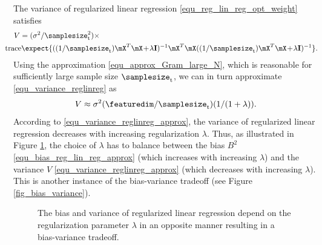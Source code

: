 \documentclass[12pt]{report}
\begin{document}
The variance of regularized linear regression \eqref{equ_reg_lin_reg_opt_weight} satisfies 
\begin{align}
\label{equ_variance_reglinreg}
V & =( \sigma^{2}/\samplesize^{2}_{\rm t}) \times \nonumber \\ 
& \hspace*{-7mm} {\rm trace} \expect \{  ( (1/\samplesize_{\rm t}) \mX^{T} \mX\!+\!\lambda \mathbf{I} )^{-1} \mX^{T} \mX ( (1/\samplesize_{\rm t}) \mX^{T} \mX\!+\!\lambda \mathbf{I} )^{-1}   \}.
\end{align}
Using the approximation \eqref{equ_approx_Gram_large_N}, which is reasonable for sufficiently 
large sample size $\samplesize_{\rm t}$, we can in turn approximate \eqref{equ_variance_reglinreg} as 
\begin{equation}
\label{equ_variance_reglinreg_approx}
V \approx \sigma^{2} (\featuredim/\samplesize_{\rm t}) (1/(1+ \lambda)).
\end{equation} 
According to \eqref{equ_variance_reglinreg_approx}, the variance of regularized linear regression decreases with 
increasing regularization $\lambda$. Thus, as illustrated in Figure \ref{fig_bias_variance_lambda}, the choice of 
$\lambda$ has to balance between the bias $B^{2}$ \eqref{equ_bias_reg_lin_reg_approx} (which increases with 
increasing $\lambda$) and the variance $V$ \eqref{equ_variance_reglinreg_approx} (which decreases with 
increasing $\lambda$). This is another instance of the bias-variance tradeoff (see Figure \ref{fig_bias_variance}). 

\begin{figure}
\begin{center}
\end{center}
\caption{The bias and variance of regularized linear regression depend on the regularization parameter 
$\lambda$ in an opposite manner resulting in a bias-variance tradeoff.}
\label{fig_bias_variance_lambda}
\end{figure}

\end{document}
